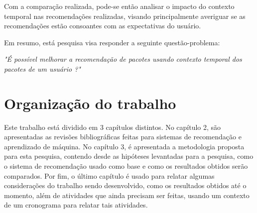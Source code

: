 Com a comparação realizada, pode-se então analisar o impacto do contexto
temporal nas recomendações realizadas, visando principalmente averiguar se as
recomendações estão consoantes com as expectativas do usuário.

Em resumo, está pesquisa visa responder a seguinte questão-problema:

\textit{"É possível melhorar a recomendação de pacotes usando contexto temporal
dos pacotes de um usuário ?"}

\section{Organização do trabalho}

Este trabalho está dividido em 3 capítulos distintos. No capítulo 2,
são apresentadas as revisões bibliográficas feitas para sistemas de recomendação e aprendizado de máquina.
No capítulo 3, é apresentada a metodologia proposta para esta pesquisa, contendo desde as hipóteses levantadas para a pesquisa,
 como o sistema de recomendação usado como base e como os resultados obtidos serão comparados. Por fim, o último capítulo é usado para relatar
algumas considerações do trabalho sendo desenvolvido, como os resultados obtidos até o momento, além de atividades que ainda precisam ser feitas,
usando um contexto de um cronograma para relatar tais atividades.
